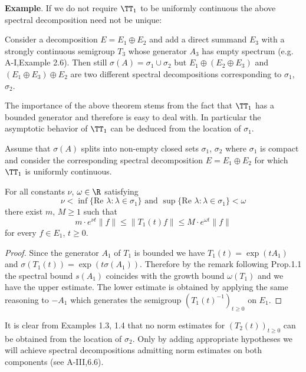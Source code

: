 \noindent
\textbf{Example}.\quad
If we do not require $\TT_{1}$ to be uniformly continuous the above spectral decomposition need not be unique:

Consider a decomposition $E = E_{1} \oplus E_{2}$ and add a direct summand $E_{3}$ with a strongly continuous semigroup $T_{3}$ whose generator $A_{3}$ has empty spectrum (e.g. A-I,Example 2.6).
Then still $\sigma(A) = \sigma_{1} \cup \sigma_{2}$ but $E_{1} \oplus (E_{2} \oplus E_{3})$ and $(E_{1} \oplus E_{3}) \oplus E_{2}$ are two different spectral decompositions corresponding to $\sigma_{1}$, $\sigma_{2}$.

The importance of the above theorem stems from the fact that $\TT_{1}$ has a bounded generator and therefore is easy to deal with.
In particular the asymptotic behavior of $\TT_{1}$ can be deduced from the location of $\sigma_{1}$.

\begin{corollary}\label{cor:a3-3.4}

Assume that $\sigma(A)$ splits into non-empty closed sets $\sigma_{1}$, $\sigma_{2}$ where $\sigma_{1}$ is compact and consider the corresponding spectral decomposition $E = E_{1} \oplus E_{2}$ for which $\TT_{1}$ is uniformly continuous.

For all constants $\nu$, $\omega \in \R$ satisfying
\[
\nu < \inf \{\text{Re }\lambda \colon \lambda \in \sigma_{1}\} \text{ and } \sup \{\text{Re }\lambda \colon \lambda \in \sigma_{1}\} < \omega
\]
there exist $m$, $M \geq 1$ such that
\[
m \cdot e^{\nu t}\|f\| \leq \|T_{1}(t)f\| \leq M \cdot e^{\omega t}\|f\|
\]
for every $f \in E_{1}$, $t \geq 0$.
\end{corollary}

\begin{proof}
Since the generator $A_{1}$ of $T_{1}$ is bounded we have $T_{1}(t) = \exp(tA_{1})$ and $\sigma(T_{1}(t)) = \exp(t\sigma(A_{1}))$.
Therefore by the remark following Prop.1.1 the spectral bound $s(A_{1})$ coincides with the growth bound $\omega(T_{1})$ and we have the upper estimate.
The lower estimate is obtained by applying the same reasoning to $-A_{1}$ which generates the semigroup $(T_{1}(t)^{-1})_{t \geq 0}$ on $E_{1}$.
\end{proof}

It is clear from Examples 1.3, 1.4 that no norm estimates for $(T_{2}(t))_{t \geq 0}$ can be obtained from the location of $\sigma_{2}$.
Only by adding appropriate hypotheses we will achieve spectral decompositions admitting norm estimates on both components (see A-III,6.6).


